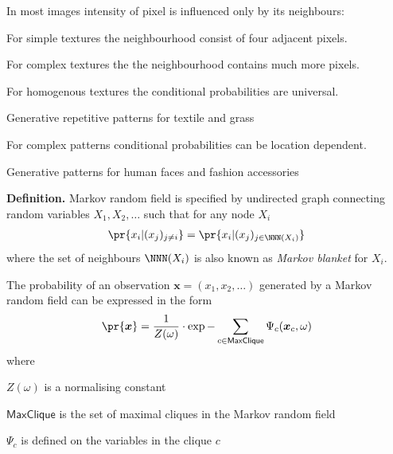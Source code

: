 \documentclass[landscape,footrule]{foils}
\renewcommand{\vec}[1]{\boldsymbol{#1}}
\begin{document}





In most images intensity of pixel is influenced only by its neighbours:
\begin{triangles}
\item For simple textures the neighbourhood consist of four adjacent pixels.
\item For complex textures the the neighbourhood contains much more pixels.
\item For homogenous textures the conditional probabilities are universal\vspace*{0.5ex}.
\begin{diamonds}
\item Generative repetitive patterns for textile and grass\vspace*{1ex}   
\end{diamonds}

\item For complex patterns conditional probabilities can be location dependent.\vspace*{0.5ex}

\begin{diamonds}
\item Generative patterns for human faces and fashion accessories 
\end{diamonds}
\end{triangles}



\textbf{Definition.}
Markov random field is specified by undirected graph connecting random variables $X_1,X_2,\ldots$ such that for any node $X_i$ 
\begin{align*}
\pr{x_i|(x_j)_{j\neq i}}=\pr{x_i| (x_j)_{j\in\NNN(X_i)} }
\end{align*}
where the set of neighbours $\NNN(X_i)$ is also known as \emph{Markov blanket} for $X_i$. 



The probability of an observation $\vec{x}=(x_1,x_2,\ldots)$ generated by a Markov random field can be expressed in the form 
\begin{align*}
\pr{\vec{x}}=\frac{1}{Z(\omega)}\cdot\exp{-\sum_{c\in\textsf{MaxClique}}\Psi_c(\vec{x}_c,\omega)} 
\end{align*}  
where
\begin{triangles}
\item $Z(\omega)$ is a normalising constant
\item $\textsf{MaxClique}$ is the set of maximal cliques in the Markov random field
\item $\Psi_c$ is defined on the variables in the clique $c$ 
\end{triangles}
\vspace*{2ex}
\end{document}
